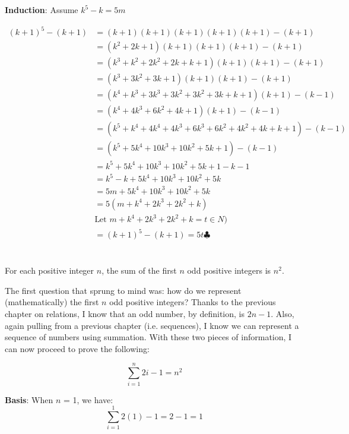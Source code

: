 \documentclass{article}
\begin{document}
\textbf{Induction}:
Assume $k^5 - k = 5m$

\begin{align*}
(k+1)^5 - (k+1) &= (k+1)(k+1)(k+1)(k+1)(k+1) - (k+1) \\
                &= (k^2 + 2k + 1)(k+1)(k+1)(k+1) - (k+1) \\
                &= (k^3 + k^2 + 2k^2 + 2k + k + 1)(k+1)(k+1) - (k+1)\\
                &= (k^3 + 3k^2 + 3k + 1)(k+1)(k+1) - (k+1) \\
                &= (k^4 + k^3 + 3k^3 + 3k^2 + 3k^2 + 3k + k + 1)(k+1) - (k-1) \\
                &= (k^4 + 4k^3 + 6k^2 + 4k + 1)(k+1) - (k-1) \\
                &= (k^5 + k^4 + 4k^4 + 4k^3 + 6k^3 + 6k^2 + 4k^2 + 4k + k + 1) - (k-1) \\
                &= (k^5 + 5k^4 + 10k^3 + 10k^2 + 5k + 1) - (k -1 ) \\
                &= k^5 + 5k^4 + 10k^3 + 10k^2 + 5k + 1 - k -1  \\
                &= k^5 -k + 5k^4 + 10k^3 + 10k^2 + 5k \\
                &= 5m + 5k^4 + 10k^3 + 10k^2 + 5k \\
                &= 5(m + k^4 + 2k^3 + 2k^2 + k) \\
                & \text{Let } m + k^4 + 2k^3 + 2k^2 + k = t \in N) \\
                &= (k+1)^5 - (k+1) = 5t \clubsuit
\end{align*}


\newpage
\section{}

For each positive integer $n$, the sum of the first $n$ odd positive integers is $n^2$.

The first question that sprung to mind was: how do we represent (mathematically) the first $n$ odd positive integers? Thanks to the previous chapter on relations, I know that an odd number, by definition, is $2n -1$. Also, again pulling from a previous chapter (i.e. sequences), I know we can represent a sequence of numbers using summation.  With these two pieces of information, I can now proceed to prove the following:


$$\sum_{i=1}^{n} 2i-1 = n^2$$

\textbf{Basis}: When $n$ = 1, we have: $$\sum_{i=1}^{1} 2(1)-1 = 2 - 1 = 1$$
\end{document}

